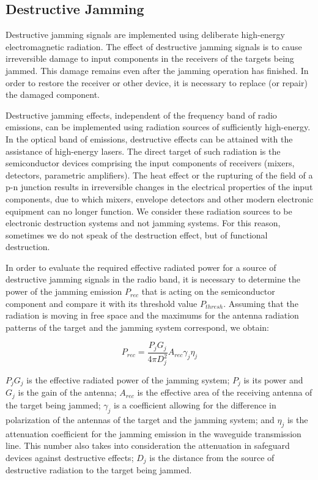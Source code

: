 \documentclass[english,purist]{ist-report}
\begin{document}
\subsection{Destructive Jamming}
Destructive jamming signals are implemented using deliberate high-energy electromagnetic radiation. The effect of destructive jamming signals is to cause irreversible damage to input components in the receivers of the targets being jammed. This damage remains even after the jamming operation has finished. In order to restore the receiver or other device, it is necessary to replace (or repair) the damaged component. 

Destructive jamming effects, independent of the frequency band of radio emissions, can be implemented using radiation sources of sufficiently high-energy.  In the optical band of emissions, destructive effects can be attained with the assistance of high-energy lasers. The direct target of such radiation is the
semiconductor devices comprising the input components of receivers
(mixers, detectors, parametric amplifiers). The heat effect or the rupturing of the field of a p-n junction results in irreversible changes in the electrical properties of the input components, due to which mixers, envelope detectors and other modern electronic equipment can no longer function. We consider these radiation sources to be electronic destruction systems and not jamming systems. For this reason, sometimes we do not speak of the destruction effect, but of functional destruction.

In order to evaluate the required effective radiated power for a source of destructive jamming signals in the radio band, it is necessary to determine the power of the jamming emission $P_{rec}$ that is acting on the semiconductor component and compare it with its threshold value $P_{thresh}$. Assuming that the radiation is moving in free space and the maximums for the antenna radiation patterns of the target and the jamming system correspond, we obtain:

\begin{equation*}
P_{rec}= \frac{P_j G_j}{4 \pi D_j ^2} A_{rec} \gamma_j \eta_j    
\end{equation*}

$P_j G_j$ is the effective radiated power of the jamming system; $P_j$ is its power and $G_j$ is the gain of the antenna; $A_{rec}$ is the effective area of the receiving antenna of the target being jammed; $\gamma_{j}$ is a coefficient allowing for the difference in polarization of the antennas of the target and the jamming system; and $\eta_j$ is the attenuation coefficient for the jamming emission in the waveguide transmission line. This number also takes into consideration the attenuation in safeguard devices against destructive effects; $D_j$ is the distance from the source of destructive radiation to the target being jammed. 
\end{document}
